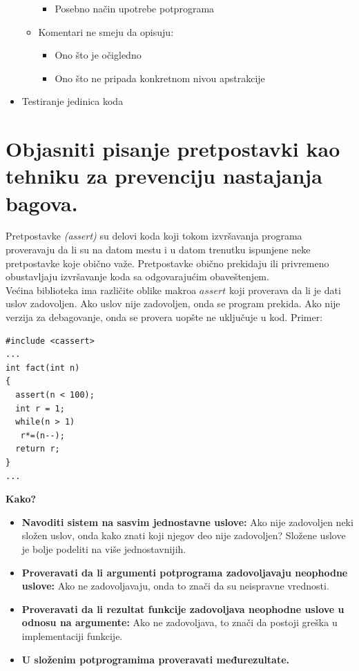 \documentclass[a4paper]{article}
\begin{document}
\begin{itemize}
\begin{itemize}
\begin{itemize}
	    \item Posebno način upotrebe potprograma
          \end{itemize}
        \item Komentari ne smeju da opisuju:
          \begin{itemize}
            \item Ono što je očigledno
            \item Ono što ne pripada konkretnom nivou apstrakcije
          \end{itemize}
      \end{itemize}
    \item Testiranje jedinica koda
  \end{itemize}

\section{Objasniti pisanje pretpostavki kao tehniku za prevenciju nastajanja bagova.}
  Pretpostavke \textit{(assert)} su delovi koda koji tokom izvršavanja programa proveravaju da li su
  na datom mestu i u datom trenutku ispunjene neke pretpostavke koje obično važe. Pretpostavke 
  obično prekidaju ili privremeno obustavljaju izvršavanje koda sa odgovarajućim obaveštenjem.\\
  \indent Većina biblioteka ima različite oblike makroa $assert$ koji proverava da li je dati
  uslov zadovoljen. Ako uslov nije zadovoljen, onda se program prekida. Ako nije verzija za
  debagovanje, onda se provera uopšte ne uključuje u kod. Primer:
\begin{lstlisting}
#include <cassert>
...
int fact(int n)
{
  assert(n < 100);
  int r = 1;
  while(n > 1)
   r*=(n--);
  return r;
}
...
\end{lstlisting}
  \textbf{Kako?}
  \begin{itemize}
    \item \textbf{Navoditi sistem na sasvim jednostavne uslove:} Ako nije zadovoljen neki složen uslov,
          onda kako znati koji njegov deo nije zadovoljen? Složene uslove je bolje podeliti
          na više jednostavnijih.
    \item \textbf{Proveravati da li argumenti potprograma zadovoljavaju neophodne uslove:} 
          Ako ne zadovoljavaju, onda to znači da su neispravne vrednosti.
    \item \textbf{Proveravati da li rezultat funkcije zadovoljava neophodne uslove u odnosu na 
          argumente:} Ako ne zadovoljava, to znači da postoji greška u implementaciji funkcije.
      \item \textbf{U složenim potprogramima proveravati međurezultate.}
  \end{itemize}
\end{document}
